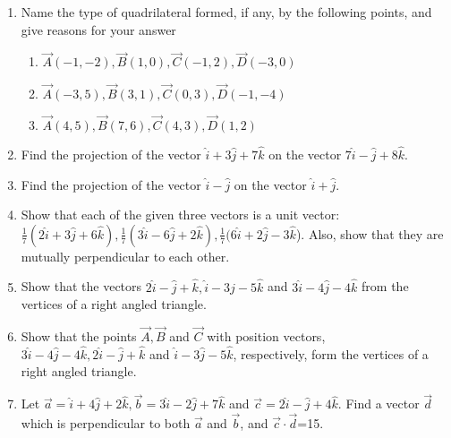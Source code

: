 \begin{enumerate}[label=\thesubsection.\arabic*, ref=\thesubsection.\theenumi]
\item Name the type of quadrilateral formed,  if any,  by the following points, and give reasons for your answer
\begin{enumerate}
\item $\vec{A}(-1, -2),  \vec{B}(1, 0),  \vec{C}(-1, 2),  \vec{D}(-3, 0)$
\item $\vec{A}(-3, 5),  \vec{B}(3, 1),  \vec{C}(0, 3),  \vec{D}(-1, -4)$
\item $\vec{A}(4, 5),  \vec{B}(7, 6),  \vec{C}(4, 3),  \vec{D}(1, 2)$
\end{enumerate}
\solution
		
\item Find the projection of the vector $\hat{i}+3\hat{j}+7\hat{k}$ on the vector $7\hat{i}-\hat{j}+8\hat{k}$.
	\\
	\solution
		
\item Find the projection of the vector $\hat{i}-\hat{j}$ on the vector $\hat{i}+\hat{j}$.
	\\
\solution
		
\item Show that each of the given three vectors is a unit vector: 
 $\frac{1}{7}(2\hat{i}+3\hat{j}+6\hat{k}), \frac{1}{7}(3\hat{i}-6\hat{j}+2\hat{k}), \frac{1}{7}(6\hat{i}+2\hat{j}-3\hat{k}$).
Also, show that they are mutually perpendicular to each other.
	\\
	\solution
		
\item Show that the vectors $2\hat{i}-\hat{j}+\hat{k}, \hat{i}-3\hat{j}-5\hat{k}$ and  $3\hat{i}-4\hat{j}-4\hat{k}$ from the vertices of a right angled triangle.
	\\
	\solution
		
\item Show that the points $\vec{A},  \vec{B}$ and $\vec{C}$ with position vectors,  $3\hat{i}-4\hat{j}-4\hat{k},  2\hat{i}-\hat{j}+\hat{k}$ and $\hat{i}-3\hat{j}-5\hat{k}$,  respectively,  form the vertices of a right angled
triangle.
\\
\solution
		
\item Let $\vec{a}=\hat{i}+4\hat{j}+2\hat{k},  \vec{b}=3\hat{i}-2\hat{j}+7\hat{k}$ and $\vec{c}=2\hat{i}-\hat{j}+4\hat{k}$. Find a vector $\vec{d}$ which is perpendicular to both $\vec{a}$ and $\vec{b}$,  and $\vec{c}\cdot \vec{d}$=15.\\

\end{enumerate}
